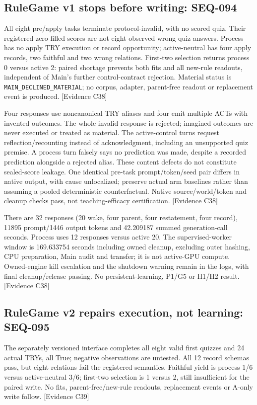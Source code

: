 \documentclass[11pt]{article}
\newcommand{\ev}[1]{\textsf{[Evidence #1]}}
\begin{document}
\subsection{RuleGame v1 stops before writing: SEQ-094}
All eight pre/apply tasks terminate protocol-invalid, with no scored quiz.
Their registered zero-filled scores are not eight observed wrong quiz answers.
Process has no apply TRY execution or record opportunity; active-neutral has
four apply records, two faithful and two wrong relations. First-two selection
returns process 0 versus active 2: paired shortage prevents both fits and all
new-rule readouts, independent of Main's further control-contract rejection.
Material status is \texttt{MAIN\_DECLINED\_MATERIAL}; no corpus, adapter,
parent-free readout or replacement event is produced. \ev{C38}

Four responses use noncanonical TRY aliases and four emit multiple ACTs with
invented outcomes. The whole invalid response is rejected; imagined outcomes
are never executed or treated as material. The active-control turns request
reflection/recounting instead of acknowledgment, including an unsupported quiz
premise. A process turn falsely says no prediction was made, despite a recorded
prediction alongside a rejected alias. These content defects do not constitute
sealed-score leakage. One identical pre-task prompt/token/seed pair differs in
native output, with cause unlocalized; preserve actual arm baselines rather
than assuming a pooled deterministic counterfactual. Native source/world/token
and cleanup checks pass, not teaching-efficacy certification. \ev{C38}

There are 32 responses (20 wake, four parent, four restatement, four record),
11895 prompt/1446 output tokens and 42.209187 summed generation-call seconds.
Process uses 12 responses versus active 20. The supervised-worker window is
169.633754 seconds including owned cleanup, excluding outer hashing, CPU
preparation, Main audit and transfer; it is not active-GPU compute. Owned-engine
kill escalation and the shutdown warning remain in the logs, with final
cleanup/release passing. No persistent-learning, P1/G5 or H1/H2 result. \ev{C38}

\subsection{RuleGame v2 repairs execution, not learning: SEQ-095}
The separately versioned interface completes all eight valid first quizzes and
24 actual TRYs, all True; negative observations are untested. All 12 record
schemas pass, but eight relations fail the registered semantics. Faithful yield
is process 1/6 versus active-neutral 3/6; first-two selection is 1 versus 2,
still insufficient for the paired write. No fits, parent-free/new-rule readouts,
replacement events or A-only write follow. \ev{C39}
\end{document}
